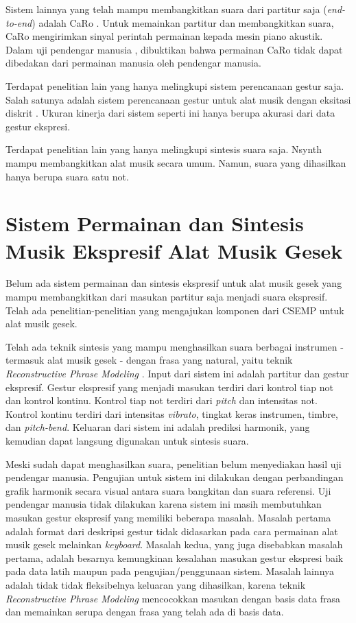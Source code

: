 Sistem lainnya yang telah mampu membangkitkan suara dari partitur saja (\textit{end-to-end}) adalah CaRo \parencite{canazza2015}. Untuk memainkan partitur dan membangkitkan suara, CaRo mengirimkan sinyal perintah permainan kepada mesin piano akustik. Dalam uji pendengar manusia \parencite{schubert2017test}, dibuktikan bahwa permainan CaRo tidak dapat dibedakan dari permainan manusia oleh pendengar manusia.

Terdapat penelitian lain yang hanya melingkupi sistem perencanaan gestur saja. Salah satunya adalah sistem perencanaan gestur untuk alat musik dengan eksitasi diskrit \parencite{miranda2010}. Ukuran kinerja dari sistem seperti ini hanya berupa akurasi dari data gestur ekspresi.

Terdapat penelitian lain yang hanya melingkupi sintesis suara saja. Nsynth \parencite{nsynth2017} mampu membangkitkan alat musik secara umum. Namun, suara yang dihasilkan hanya berupa suara satu not.

\section{Sistem Permainan dan Sintesis Musik Ekspresif Alat Musik Gesek}

Belum ada sistem permainan dan sintesis ekspresif untuk alat musik gesek yang mampu membangkitkan dari masukan partitur saja menjadi suara ekspresif. Telah ada penelitian-penelitian yang mengajukan komponen dari CSEMP untuk alat musik gesek.

Telah ada teknik sintesis yang mampu menghasilkan suara berbagai instrumen - termasuk alat musik gesek - dengan frasa yang natural, yaitu teknik \textit{Reconstructive Phrase Modeling} \parencite{lindemann2007rpm}. Input dari sistem ini adalah partitur dan gestur ekspresif. Gestur ekspresif yang menjadi masukan terdiri dari kontrol tiap not dan kontrol kontinu. Kontrol tiap not terdiri dari \textit{pitch} dan intensitas not. Kontrol kontinu terdiri dari intensitas \textit{vibrato}, tingkat keras instrumen, timbre, dan \textit{pitch-bend}. Keluaran dari sistem ini adalah prediksi harmonik, yang kemudian dapat langsung digunakan untuk sintesis suara.

Meski sudah dapat menghasilkan suara, penelitian \citet{lindemann2007rpm} belum menyediakan hasil uji pendengar manusia. Pengujian untuk sistem ini dilakukan dengan perbandingan grafik harmonik secara visual antara suara bangkitan dan suara referensi. Uji pendengar manusia tidak dilakukan karena sistem ini masih membutuhkan masukan gestur ekspresif yang memiliki beberapa  masalah. Masalah pertama adalah format dari deskripsi gestur tidak didasarkan pada cara permainan alat musik gesek melainkan \textit{keyboard}. Masalah kedua, yang juga disebabkan masalah pertama, adalah besarnya kemungkinan kesalahan masukan gestur ekspresi baik pada data latih maupun pada pengujian/penggunaan sistem. Masalah lainnya adalah tidak tidak fleksibelnya keluaran yang dihasilkan, karena teknik \textit{Reconstructive Phrase Modeling} mencocokkan masukan dengan basis data frasa dan memainkan serupa dengan frasa yang telah ada di basis data.

